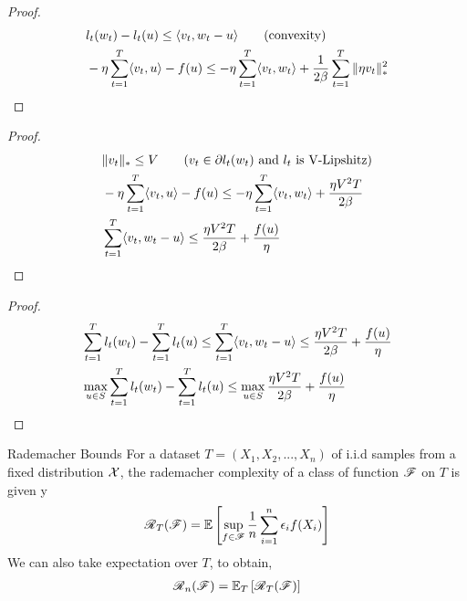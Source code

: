 \begin{frame}
  \begin{proof}
    \begin{align*}    
      & l_t(w_t) - l_t(u) \le \langle {v_t} , {w_t - u} \rangle \tag{convexity} \\
      & -\eta\sum_{t=1}^T \langle {v_t} , {u} \rangle -f(u) \le -\eta\sum_{t=1}^T \langle {v_t} , {w_t} \rangle +\frac{1}{2\beta} \sum_{t=1}^T \|\eta v_t\|_{*}^2 \\
    \end{align*}
  \end{proof}
\end{frame}

\begin{frame}
  \begin{proof}
    \begin{align*}    
      & \|v_t\|_{*} \le V \tag{$v_t \in \partial l_t(w_t)$ and $l_t$ is V-Lipshitz} \\
      & -\eta\sum_{t=1}^T \langle {v_t} , {u} \rangle -f(u) \le -\eta\sum_{t=1}^T \langle {v_t} , {w_t} \rangle +\frac{\eta V^2T}{2\beta} \\
      & \sum_{t=1}^T \langle {v_t} , {w_t - u} \rangle \le \frac{\eta V^2T}{2\beta} + \frac{f(u)}{\eta} \\
    \end{align*}  
  \end{proof}
\end{frame}
\begin{frame}
  \begin{proof}
    \begin{align*}    
      & \sum_{t=1}^T l_t(w_t) - \sum_{t=1}^T l_t(u) \le \sum_{t=1}^T \langle {v_t} , {w_t - u} \rangle \le \frac{\eta V^2T}{2\beta} + \frac{f(u)}{\eta} \\
      & \max_{u \in S} \sum_{t=1}^T l_t(w_t) - \sum_{t=1}^T l_t(u) \le \max_{u \in S} \frac{\eta V^2T}{2\beta} + \frac{f(u)}{\eta}
    \end{align*}  
  \end{proof}
\end{frame}


\begin{frame}{Rademacher Bounds}
  For a dataset $T=(X_1,X_2,...,X_n)$ of i.i.d samples from a fixed distribution $\operatorname{\mathcal{X}}$, the rademacher complexity of a class of function $\operatorname{\mathscr{F}}$ on $T$ is given y
  \begin{align*}
    \operatorname{\mathscr{R}}_T(\operatorname{\mathscr{F}}) = \operatorname{\mathbb{E}} \left[ \sup_{f \in \operatorname{\mathscr{F}}} \frac{1}{n}\sum_{i=1}^n \epsilon_i f(X_i) \right]
  \end{align*}
  We can also take expectation over $T$, to obtain,
  \begin{align*}
  \operatorname{\mathscr{R}}_n(\operatorname{\mathscr{F}})=\operatorname{\mathbb{E}}_{T}\left[\operatorname{\mathscr{R}}_T(\operatorname{\mathscr{F}})\right]
  \end{align*}
\end{frame}


